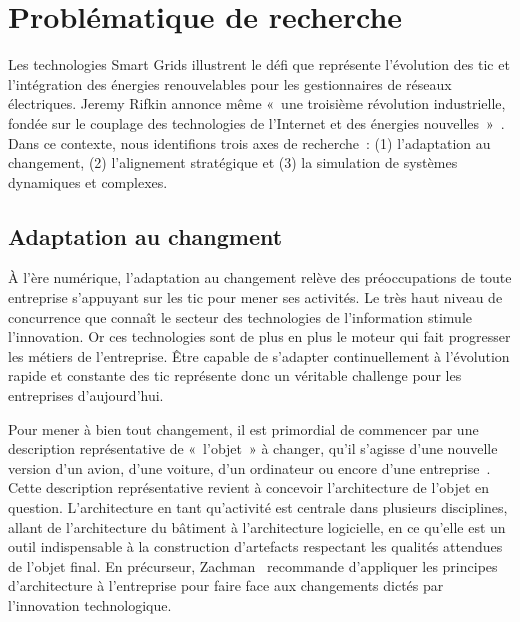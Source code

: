  
\section{Problématique de recherche}


Les technologies Smart Grids illustrent le défi que représente l'évolution des 
\gls{tic} et l'intégration des énergies renouvelables pour les gestionnaires de 
réseaux électriques. Jeremy Rifkin annonce même «~une troisième révolution 
industrielle, fondée sur le couplage des technologies de l’Internet et des 
énergies nouvelles~»~\cite{rifkin2012troisieme}. Dans ce contexte, nous identifions
trois axes de recherche~: (1) l'adaptation au changement, (2) l'alignement stratégique et
(3) la simulation de systèmes dynamiques et complexes.



\subsection{Adaptation au changment}

À l'ère numérique, l'adaptation au changement relève des préoccupations de 
toute entreprise s'appuyant sur les \gls{tic} pour mener ses 
activités. Le très haut niveau de concurrence que connaît le secteur des 
technologies de l'information stimule l'innovation. Or ces technologies sont de 
plus en plus le moteur qui fait progresser les  métiers de l'entreprise. Être 
capable de s'adapter continuellement à l'évolution rapide et 
constante des \gls{tic} représente donc un véritable challenge pour les 
entreprises 
d'aujourd'hui.

Pour mener à bien tout changement, il est primordial de commencer par une 
description représentative de «~l'objet~» à changer, qu'il s'agisse d'une 
nouvelle version d'un avion, d'une voiture, d'un ordinateur ou encore d'une 
entreprise~\cite{zachman1997enterprise}. Cette description représentative 
revient à concevoir l'architecture de l'objet en question. L'architecture en 
tant qu'activité est centrale dans plusieurs disciplines, allant de 
l'architecture du bâtiment à l'architecture logicielle, en ce qu'elle est un 
outil indispensable à la construction d'artefacts respectant les qualités 
attendues de l'objet final. En précurseur, Zachman~\cite{zachman1997enterprise} 
recommande d'appliquer les principes d'architecture à l'entreprise pour faire 
face aux changements dictés par l'innovation technologique.

